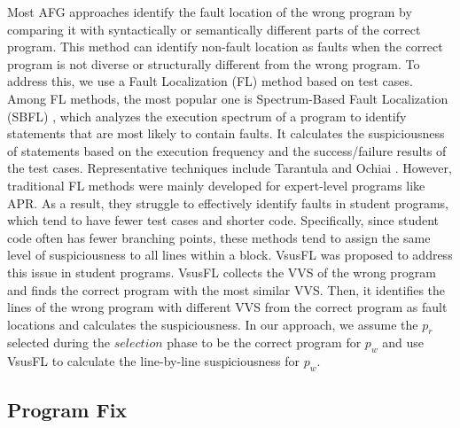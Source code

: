 \documentclass[10pt,conference]{IEEEtran}
\begin{document}
        Most AFG approaches \cite{singh2013automated, d2016qlose, gulwani2018automated, wang2018search, hu2019re} identify the fault location of the wrong program by comparing it with syntactically or semantically different parts of the correct program. This method can identify non-fault location as faults when the correct program is not diverse or structurally different from the wrong program. To address this, we use a Fault Localization (FL) method based on test cases. Among FL methods, the most popular one is Spectrum-Based Fault Localization (SBFL) \cite{abreu2009spectrum}, which analyzes the execution spectrum of a program to identify statements that are most likely to contain faults. It calculates the suspiciousness of statements based on the execution frequency and the success/failure results of the test cases. Representative techniques include Tarantula \cite{jones2001visualization} and Ochiai \cite{abreu2006evaluation}. However, traditional FL methods were mainly developed for expert-level programs like APR. As a result, they struggle to effectively identify faults in student programs, which tend to have fewer test cases and shorter code. Specifically, since student code often has fewer branching points, these methods tend to assign the same level of suspiciousness to all lines within a block. VsusFL \cite{li2023vsusfl} was proposed to address this issue in student programs. VsusFL collects the VVS of the wrong program and finds the correct program with the most similar VVS. Then, it identifies the lines of the wrong program with different VVS from the correct program as fault locations and calculates the suspiciousness. In our approach, we assume the $p_{r}$ selected during the $selection$ phase to be the correct program for $p_{w}$ and use VsusFL to calculate the line-by-line suspiciousness for $p_{w}$.



    \subsection{Program Fix}\label{programFix}
\end{document}
